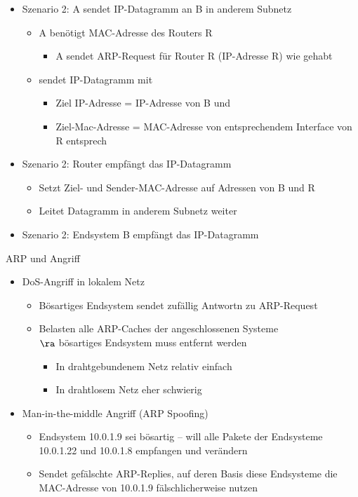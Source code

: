       \begin{itemize}
        \item Szenario 2: A sendet IP-Datagramm an B in anderem Subnetz
          \begin{itemize}
            \item A benötigt MAC-Adresse des Routers R
              \begin{itemize}
                \item A sendet ARP-Request für Router R (IP-Adresse R) wie gehabt
              \end{itemize}
            \item sendet IP-Datagramm mit
              \begin{itemize}
                \item Ziel IP-Adresse = IP-Adresse von B und
                \item Ziel-Mac-Adresse = MAC-Adresse von entsprechendem Interface von R
                  entsprech
              \end{itemize}
          \end{itemize}
        \item Szenario 2: Router empfängt das IP-Datagramm
          \begin{itemize}
            \item Setzt Ziel- und Sender-MAC-Adresse auf Adressen von B und R
            \item Leitet Datagramm in anderem Subnetz weiter
          \end{itemize}
        \item Szenario 2: Endsystem B empfängt das IP-Datagramm
      \end{itemize}
      ARP und Angriff
      \begin{itemize}
        \item DoS-Angriff in lokalem Netz
          \begin{itemize}
            \item Bösartiges Endsystem sendet zufällig Antwortn zu ARP-Request
            \item Belasten alle ARP-Caches der angeschlossenen Systeme\\
              $\ra$ bösartiges Endsystem muss entfernt werden
              \begin{itemize}
                \item In drahtgebundenem Netz relativ einfach
                \item In drahtlosem Netz eher schwierig
              \end{itemize}
          \end{itemize}
        \item Man-in-the-middle Angriff (ARP Spoofing)
          \begin{itemize}
            \item Endsystem 10.0.1.9 sei bösartig -- will alle Pakete der Endsysteme 10.0.1.22 und
              10.0.1.8 empfangen und verändern
            \item Sendet gefälschte ARP-Replies, auf deren Basis diese Endsysteme die MAC-Adresse von
              10.0.1.9 fälschlicherweise nutzen
          \end{itemize}
      \end{itemize}
